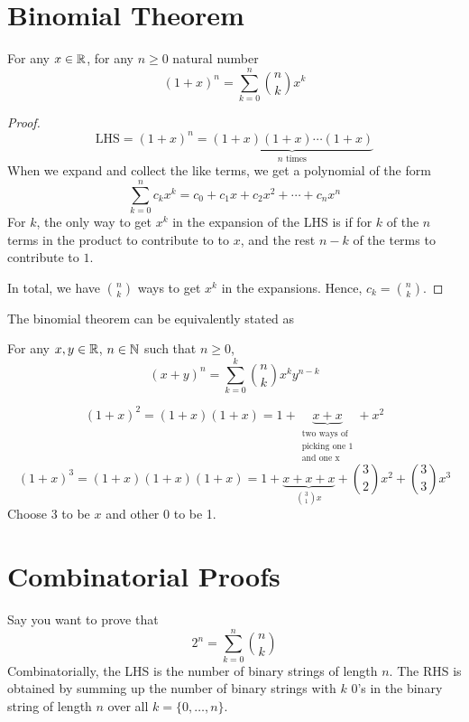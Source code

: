 \section{Binomial Theorem}

\begin{theorem}
    For any $x \in \mathbb{R}$, for any $n \geq 0$ natural number
    $$
    (1+x)^n = \sum_{k=0}^n \binom{n}{k} x^k
    $$
\end{theorem}

\begin{proof}
    $$
    \text{LHS} = (1+x)^n = \underbrace{(1+x) (1+x) \cdots (1+x)}_{\text{$n$ times}}
    $$
    When we expand and collect the like terms, we get a polynomial of the form
    $$
    \sum_{k=0}^n c_k x^k = c_0 + c_1x + c_2 x^2 + \cdots + c_n x^n
    $$
    For $k$, the only way to get $x^k$ in the expansion of the LHS is if for $k$ of the $n$ terms in the product to contribute to to $x$, and the rest $n-k$ of the terms to contribute to $1$.

    In total, we have $\binom{n}{k}$ ways to get $x^k$ in the expansions. Hence, $c_k = \binom{n}{k}$.
\end{proof}

The binomial theorem can be equivalently stated as
\begin{theorem}
    For any $x,y \in \mathbb{R}$, $n \in \mathbb{N}$ such that $n \geq 0$,
    $$
    (x+y)^n = \sum_{k=0}^k \binom{n}{k} x^k y^{n-k}
    $$
\end{theorem}

\begin{example}
    $$
    (1+x)^2 = (1 + x)(1 + x) = 1 + \underbrace{x + x}_{\substack{\text{two ways of} \\  \text{picking one 1} \\ \text{and one x}}} + x^2
    $$
    $$
    (1+x)^3 = (1+x) (1+x) (1+x) = 1 + \underbrace{x + x + x}_{\binom{3}{1}x} + \binom{3}{2} x^2 + \binom{3}{3}x^3
    $$
    Choose 3 to be $x$ and other 0 to be 1.
\end{example}

\section{Combinatorial Proofs}

Say you want to prove that
$$
2^n = \sum_{k=0}^n \binom{n}{k}
$$
Combinatorially, the LHS is the number of binary strings of length $n$. The RHS is obtained by summing up the number of binary strings with $k$ 0's in the binary string of length $n$ over all $k = \{0,\ldots,n\}$.

